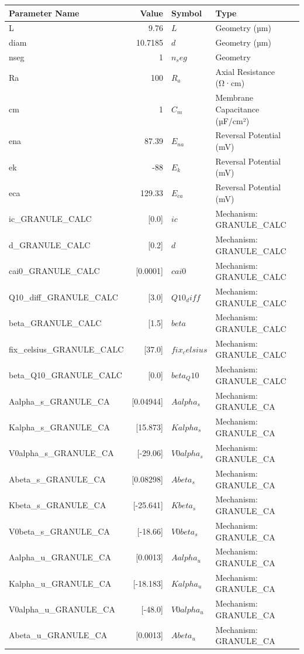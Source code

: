 \begin{tabular}{|l|r|l|l|}
\hline
Parameter Name & Value & Symbol & Type \\
\hline
L & 9.76 & $L$ & Geometry (µm) \\
diam & 10.7185 & $d$ & Geometry (µm) \\
nseg & 1 & $n_seg$ & Geometry \\
Ra & 100 & $R_a$ & Axial Resistance (Ω·cm) \\
cm & 1 & $C_m$ & Membrane Capacitance (µF/cm²) \\
ena & 87.39 & $E_{na}$ & Reversal Potential (mV) \\
ek & -88 & $E_{k}$ & Reversal Potential (mV) \\
eca & 129.33 & $E_{ca}$ & Reversal Potential (mV) \\
ic_GRANULE_CALC & [0.0] & $ic$ & Mechanism: GRANULE_CALC \\
d_GRANULE_CALC & [0.2] & $d$ & Mechanism: GRANULE_CALC \\
cai0_GRANULE_CALC & [0.0001] & $cai0$ & Mechanism: GRANULE_CALC \\
Q10_diff_GRANULE_CALC & [3.0] & $Q10_diff$ & Mechanism: GRANULE_CALC \\
beta_GRANULE_CALC & [1.5] & $beta$ & Mechanism: GRANULE_CALC \\
fix_celsius_GRANULE_CALC & [37.0] & $fix_celsius$ & Mechanism: GRANULE_CALC \\
beta_Q10_GRANULE_CALC & [0.0] & $beta_Q10$ & Mechanism: GRANULE_CALC \\
Aalpha_s_GRANULE_CA & [0.04944] & $Aalpha_s$ & Mechanism: GRANULE_CA \\
Kalpha_s_GRANULE_CA & [15.873] & $Kalpha_s$ & Mechanism: GRANULE_CA \\
V0alpha_s_GRANULE_CA & [-29.06] & $V0alpha_s$ & Mechanism: GRANULE_CA \\
Abeta_s_GRANULE_CA & [0.08298] & $Abeta_s$ & Mechanism: GRANULE_CA \\
Kbeta_s_GRANULE_CA & [-25.641] & $Kbeta_s$ & Mechanism: GRANULE_CA \\
V0beta_s_GRANULE_CA & [-18.66] & $V0beta_s$ & Mechanism: GRANULE_CA \\
Aalpha_u_GRANULE_CA & [0.0013] & $Aalpha_u$ & Mechanism: GRANULE_CA \\
Kalpha_u_GRANULE_CA & [-18.183] & $Kalpha_u$ & Mechanism: GRANULE_CA \\
V0alpha_u_GRANULE_CA & [-48.0] & $V0alpha_u$ & Mechanism: GRANULE_CA \\
Abeta_u_GRANULE_CA & [0.0013] & $Abeta_u$ & Mechanism: GRANULE_CA \\

\end{tabular}
